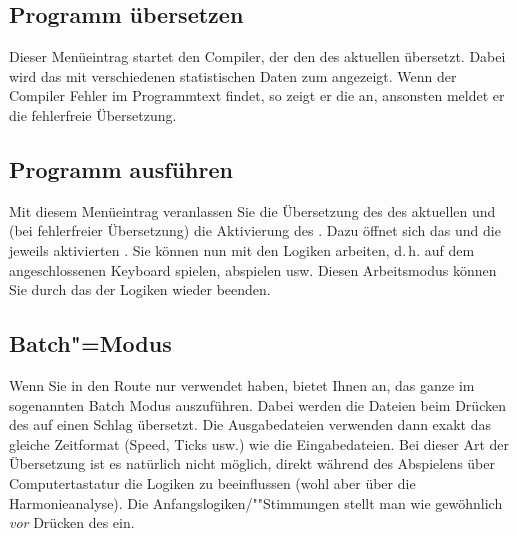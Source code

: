 \subsection{Programm übersetzen}
\label{sec:MI_COMPILE}


Dieser Menüeintrag startet den Compiler, der den
 des aktuellen
 übersetzt. Dabei wird das
 mit verschiedenen
statistischen Daten zum 
angezeigt. Wenn der Compiler Fehler im Programmtext findet, so zeigt
er die an, ansonsten meldet er die fehlerfreie Übersetzung.


\subsection{Programm ausführen}
\label{sec:MI_ACTIVATE}

Mit diesem Menüeintrag veranlassen Sie die Übersetzung des
 des aktuellen
 und (bei fehlerfreier
Übersetzung) die Aktivierung des
. Dazu öffnet sich das
 und die jeweils aktivierten
. Sie können nun mit den
Logiken arbeiten, d.\,h. auf dem angeschlossenen Keyboard spielen,
 abspielen usw.  Diesen
Arbeitsmodus können Sie durch das  der
Logiken wieder beenden.

\subsection{Batch"=Modus}


Wenn Sie in den Route nur  verwendet 
haben, bietet \mutabor{} Ihnen an, das ganze im sogenannten 
Batch Modus auszuführen. Dabei werden die Dateien beim Drücken 
des  auf einen Schlag übersetzt. 
Die Ausgabedateien verwenden dann exakt das gleiche Zeitformat 
(Speed, Ticks usw.) wie die Eingabedateien. Bei dieser Art der 
Übersetzung ist es natürlich nicht möglich, direkt während 
des Abspielens über Computertastatur die Logiken zu beeinflussen 
(wohl aber über die Harmonieanalyse). Die Anfangslogiken/""Stimmungen 
stellt man wie gewöhnlich \emph{vor} Drücken des  
ein.

